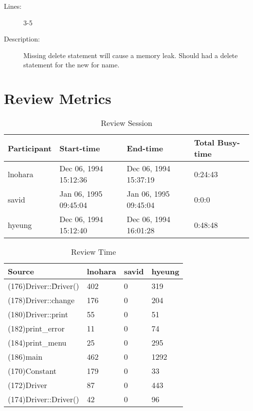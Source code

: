 \begin{enumerate}
\begin{description}
\item [Lines:] 3-5

\item [Description:] Missing delete statement will cause a memory
leak.  Should had a delete statement for the new for name.
\end{description}
\end{enumerate}
\section{Review Metrics}
\begin{table}[hb]
\begin{center}
\begin{tabular}{|l|l|l|l|}
\hline
Participant & Start-time & End-time & Total Busy-time \\
\hline
lnohara & Dec 06, 1994 15:12:36 & Dec 06, 1994 15:37:19 & 0:24:43 \\
savid & Jan 06, 1995 09:45:04 & Jan 06, 1995 09:45:04 & 0:0:0 \\
hyeung & Dec 06, 1994 15:12:40 & Dec 06, 1994 16:01:28 & 0:48:48 \\
\hline
\end{tabular}
\end{center}
\caption{Review Session}
\end{table}


\begin{table}[hb]
\begin{center}
\begin{tabular}{|l|l|l|l|}
\hline
Source & lnohara & savid & hyeung\\
\hline
(176)Driver::\~Driver() & 402 & 0 & 319\\
(178)Driver::change & 176 & 0 & 204\\
(180)Driver::print & 55 & 0 & 51\\
(182)print\_error & 11 & 0 & 74\\
(184)print\_menu & 25 & 0 & 295\\
(186)main & 462 & 0 & 1292\\
(170)Constant & 179 & 0 & 33\\
(172)Driver & 87 & 0 & 443\\
(174)Driver::Driver() & 42 & 0 & 96\\
\hline
\end{tabular}
\end{center}
\caption{Review Time}
\end{table}


